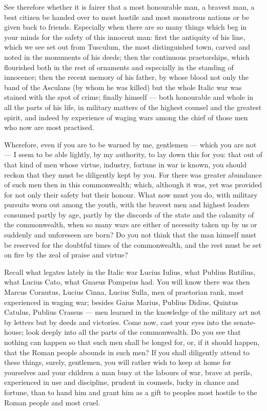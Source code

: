  See therefore whether it is fairer that a most honourable man, a bravest man, a best citizen be handed over to most hostile and most monstrous nations or be given back to friends. Especially when there are so many things which beg in your minds for the safety of this innocent man: first the antiquity of his line, which we see set out from Tusculum, the most distinguished town, carved and noted in the monuments of his deeds; then the continuous praetorships, which flourished both in the rest of ornaments and especially in the standing of innocence; then the recent memory of his father, by whose blood not only the band of the Asculans (by whom he was killed) but the whole Italic war was stained with the spot of crime; finally himself --- both honourable and whole in all the parts of his life, in military matters of the highest counsel and the greatest spirit, and indeed by experience of waging wars among the chief of those men who now are most practised.

 Wherefore, even if you are to be warned by me, gentlemen --- which you are not --- I seem to be able lightly, by my authority, to lay down this for you: that out of that kind of men whose virtue, industry, fortune in war is known, you should reckon that they must be diligently kept by you. For there was greater abundance of such men then in this commonwealth; which, although it was, yet was provided for not only their safety but their honour. What now must you do, with military pursuits worn out among the youth, with the bravest men and highest leaders consumed partly by age, partly by the discords of the state and the calamity of the commonwealth, when so many wars are either of necessity taken up by us or suddenly and unforeseen are born? Do you not think that the man himself must be reserved for the doubtful times of the commonwealth, and the rest must be set on fire by the zeal of praise and virtue?

 Recall what legates lately in the Italic war Lucius Iulius, what Publius Rutilius, what Lucius Cato, what Gnaeus Pompeius had. You will know there was then Marcus Cornutus, Lucius Cinna, Lucius Sulla, men of praetorian rank, most experienced in waging war; besides Gaius Marius, Publius Didius, Quintus Catulus, Publius Crassus --- men learned in the knowledge of the military art not by letters but by deeds and victories. Come now, cast your eyes into the senate-house; look deeply into all the parts of the commonwealth. Do you see that nothing can happen so that such men shall be longed for, or, if it should happen, that the Roman people abounds in such men? If you shall diligently attend to these things, surely, gentlemen, you will rather wish to keep at home for yourselves and your children a man busy at the labours of war, brave at perils, experienced in use and discipline, prudent in counsels, lucky in chance and fortune, than to hand him and grant him as a gift to peoples most hostile to the Roman people and most cruel.

